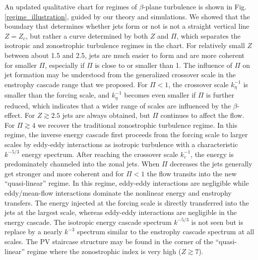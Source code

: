 \documentclass{jfm}
\begin{document}
An updated qualitative chart for regimes of $\beta$-plane turbulence is shown
in Fig. \ref{regime_illustration}, guided by our theory and simulations.
We showed that the boundary that determines whether jets form or not is not a
straight vertical line $Z=Z_{c}$, but rather a curve determined by
both $Z$ and $\Pi$, which separates the isotropic and zonostrophic turbulence
regimes in the chart. For relatively small $Z$ between about 1.5 and
2.5, jets are much easier to form and are more coherent for smaller
$\Pi$, especially if $\Pi$ is close to or smaller than 1. The influence
of $\Pi$ on jet formation may be understood from the generalized crossover scale
in the enstrophy cascade range that we proposed. For $\Pi<1$, the
crossover scale $k_{\eta}^{-1}$ is smaller than the forcing scale,
and $k_{\eta}^{-1}$ becomes even smaller if $\Pi$ is further reduced,
which indicates that a wider range of scales are influenced by the $\beta$-effect.
For $Z\apprge2.5$ jets are always obtained, but $\Pi$ continues to affect the flow. 
For $\Pi\apprge 4$ we recover the traditional  zonostrophic turbulence regime. 
In this regime, the inverse energy cascade first proceeds from the
forcing scale to larger scales by eddy-eddy interactions as isotropic
turbulence with a characteristic $k^{-5/3}$ energy spectrum. After
reaching the crossover scale $k_{\varepsilon}^{-1}$, the energy is predominately
channeled into the zonal jets. When $\Pi$ decreases the jets generally get stronger
and more coherent and for $\Pi<1$ the flow transits into
the new ``quasi-linear'' regime. In this regime, eddy-eddy interactions
are negligible while eddy/mean-flow interactions dominate the nonlinear
energy and enstrophy transfers. The energy injected at the forcing
scale is directly transferred into the jets at the largest scale, whereas
eddy-eddy interactions are negligible in the energy cascade. The isotropic
energy cascade spectrum $k^{-5/3}$ is not seen but is replace by
a nearly $k^{-3}$ spectrum similar to the enstrophy cascade spectrum
at all scales. %
The PV staircase 
structure may be found in the corner of the ``quasi-linear'' 
regime where the zonostrophic index is very high ($Z\apprge7$).
\end{document}
